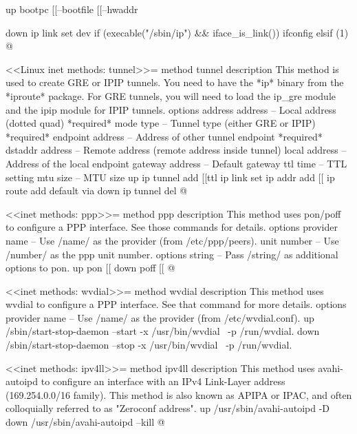 \documentclass{article}
\begin{document}
  up
    bootpc [[--bootfile %
           [[--hwaddr %

  down
    ip link set dev %
        if (execable("/sbin/ip") && iface_is_link())
    ifconfig %
        elsif (1)
@ 

<<Linux inet methods: tunnel>>=
method tunnel
  description
    This method is used to create GRE or IPIP tunnels. You need to have
    the *ip* binary from the *iproute* package. For GRE tunnels, you
    will need to load the ip_gre module and the ipip module for
    IPIP tunnels.
  options
    address address       -- Local address (dotted quad) *required*
    mode type             -- Tunnel type (either GRE or IPIP) *required*
    endpoint address      -- Address of other tunnel endpoint *required*
    dstaddr address       -- Remote address (remote address inside tunnel)
    local address         -- Address of the local endpoint
    gateway address       -- Default gateway
    ttl time              -- TTL setting
    mtu size              -- MTU size
  up
    ip tunnel add %
       [[ttl %
    ip link set %
    ip addr add %
    [[ ip route add default via %
  down
    ip tunnel del %
@ 

<<inet methods: ppp>>=
method ppp
  description
    This method uses pon/poff to configure a PPP interface. See those
    commands for details.
  options
    provider name  -- Use /name/ as the provider (from /etc/ppp/peers).
    unit number    -- Use /number/ as the ppp unit number.
    options string -- Pass /string/ as additional options to pon.
  up
    pon [[%
  down
    poff [[%
@ 

<<inet methods: wvdial>>=
method wvdial
  description
    This method uses wvdial to configure a PPP interface. See that command
    for more details.
  options
    provider name  -- Use /name/ as the provider (from /etc/wvdial.conf).
  up
    /sbin/start-stop-daemon --start -x /usr/bin/wvdial \
                      -p /run/wvdial.%
  down
    /sbin/start-stop-daemon --stop -x /usr/bin/wvdial \
                      -p /run/wvdial.%

<<inet methods: ipv4ll>>=
method ipv4ll
  description
    This method uses avahi-autoipd to configure an interface with an
    IPv4 Link-Layer address (169.254.0.0/16 family). This method is also
    known as APIPA or IPAC, and often colloquially referred to
    as "Zeroconf address".
  up
    /usr/sbin/avahi-autoipd -D %
  down
    /usr/sbin/avahi-autoipd --kill %
@
\end{document}
